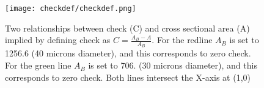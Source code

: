 %

\begin{figure}[h]
  \centering
   \texttt{[image: checkdef/checkdef.png]}
	\caption{Two relationships between check (C) and cross sectional area (A) implied by defining check as $C = \frac{A_{B} - A}{A_{B}}$. For the redline $A_{B}$ is set to 1256.6 (40 microns diameter), and this corresponds to zero check. For the green line $A_{B}$ is set to 706. (30 microns diameter), and this corresponds to zero check. Both lines intersect the X-axis at (1,0)}
  \label{fig:checkdef}
\end{figure}

%

